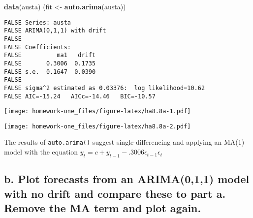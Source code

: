 \documentclass[openany]{book}
\newenvironment{Shaded}{\begin{snugshade}}{\end{snugshade}}
\newcommand{\DataTypeTok}[1]{\textcolor[rgb]{0.13,0.29,0.53}{#1}}
\newcommand{\DecValTok}[1]{\textcolor[rgb]{0.00,0.00,0.81}{#1}}
\newcommand{\KeywordTok}[1]{\textcolor[rgb]{0.13,0.29,0.53}{\textbf{#1}}}
\newcommand{\NormalTok}[1]{#1}
\newcommand{\OperatorTok}[1]{\textcolor[rgb]{0.81,0.36,0.00}{\textbf{#1}}}
\newcommand{\StringTok}[1]{\textcolor[rgb]{0.31,0.60,0.02}{#1}}
\begin{document}
\begin{Shaded}
\begin{Highlighting}[]
\KeywordTok{data}\NormalTok{(austa)}
\NormalTok{(fit <-}\StringTok{ }\KeywordTok{auto.arima}\NormalTok{(austa))}
\end{Highlighting}
\end{Shaded}

\begin{verbatim}
FALSE Series: austa 
FALSE ARIMA(0,1,1) with drift 
FALSE 
FALSE Coefficients:
FALSE          ma1   drift
FALSE       0.3006  0.1735
FALSE s.e.  0.1647  0.0390
FALSE 
FALSE sigma^2 estimated as 0.03376:  log likelihood=10.62
FALSE AIC=-15.24   AICc=-14.46   BIC=-10.57
\end{verbatim}

\begin{Shaded}
\end{Shaded}

\texttt{[image: homework-one\_files/figure-latex/ha8.8a-1.pdf]}

\begin{Shaded}
\end{Shaded}

\texttt{[image: homework-one\_files/figure-latex/ha8.8a-2.pdf]}

The results of \texttt{auto.arima()} suggest single-differencing and applying an MA(1) model with the equation \(y_t = c + y_{t-1} -.3006\epsilon_{t-1} \epsilon_t\)

\hypertarget{b.-plot-forecasts-from-an-arima011-model-with-no-drift-and-compare-these-to-part-a.-remove-the-ma-term-and-plot-again.}{%
\subsection{b. Plot forecasts from an ARIMA(0,1,1) model with no drift and compare these to part a. Remove the MA term and plot again.}\label{b.-plot-forecasts-from-an-arima011-model-with-no-drift-and-compare-these-to-part-a.-remove-the-ma-term-and-plot-again.}}
\end{document}
